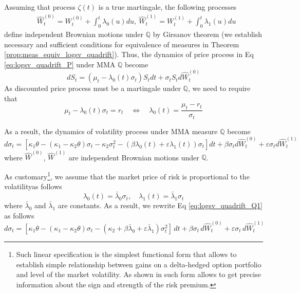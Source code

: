 \documentclass[11pt,a4paper] {article}
\begin{document}
Assuming that process $\zeta(t)$ is a true martingale, the following processes
\begin{equation}
\begin{split}
&\hat{W}^{(0)}_t=W^{(0)}_t+\int_0^t\lambda_0(u)du, \ \hat{W}^{(1)}_t=W^{(1)}_t+\int_0^t\lambda_1(u)du
\end{split}
\end{equation}
define independent Brownian motions under $\mathbb{Q}$ by Girsanov theorem (we establish necessary and sufficient conditions for equivalence of measures in Theorem \ref{prop:meas_equiv_logsv_quadrift}). 
Thus, the dynamics of price process in Eq \eqref{eq:logsv_quadrift_P} under MMA $\mathbb{Q}$ become
\begin{equation*}
dS_{t} =  \left(\mu_{t}-\lambda_0(t)\sigma_t\right) S_{t} dt + \sigma_t S_{t} d\hat{W}^{(0)}_{t}
\end{equation*}
As discounted price process must be a martingale under $\mathbb{Q}$, we need to require that 
\begin{equation}\label{eq:MPR_logsv_quad}
\mu_{t}-\lambda_0(t)\sigma_t=r_t\quad \Longleftrightarrow\quad \lambda_0(t)=\frac{\mu_{t}-r_t}{\sigma_t}
\end{equation}


As a result, the dynamics of volatility process under MMA measure $\mathbb{Q}$ become
\begin{equation}\label{eq:logsv_quadrift_Q1}
d\sigma_t=\left[\kappa_1\theta-(\kappa_1-\kappa_2\theta)\sigma_t-\kappa_2\sigma_t^2-(\beta\lambda_0(t)+\varepsilon\lambda_1(t))\sigma_t\right]dt+\beta\sigma_t d\hat{W}^{(0)}_t+\varepsilon\sigma_t d\hat{W}^{(1)}_t
\end{equation}
where $\hat{W}^{(0)}$, $\hat{W}^{(1)}$ are independent Brownian motions under $\mathbb{Q}$.

As customary\footnote{Such linear specification is the simplest functional form that allows to establish simple relationship between gains on a delta-hedged option portfolio and level of the market volatility. As shown in \cite{BaskshiKapadia2003} such form  allows to get precise information about the sign and strength of the risk premium.}, we assume that the market price of risk is proportional to the volatilityas follows
\begin{equation}\label{eq:MPVR_logsv_quadrift}
\lambda_0(t)=\bar\lambda_0\sigma_t,\quad \lambda_1(t)=\bar\lambda_1\sigma_t
\end{equation}
where $\bar\lambda_0$ and $\bar\lambda_1$ are constants. As a result, we rewrite Eq \eqref{eq:logsv_quadrift_Q1} as follows
\begin{equation}\label{eq:logsv_quadrift_Q2}
d\sigma_t=\left[\kappa_1\theta-(\kappa_1-\kappa_2\theta)\sigma_t-(\kappa_2+\beta\bar\lambda_0+\varepsilon\bar\lambda_1)\sigma_t^2\right]\,dt+\beta\sigma_t\,d\hat{W}^{(0)}_t+\varepsilon\sigma_t\,d\hat{W}^{(1)}_t
\end{equation}
\end{document}
